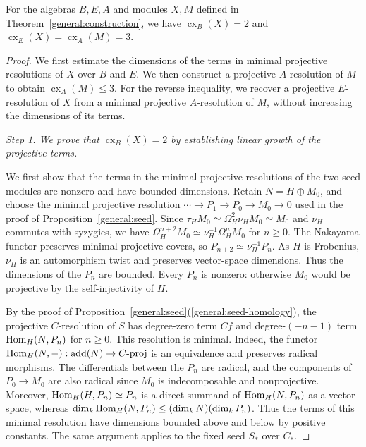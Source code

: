 \documentclass[11pt]{article}
\begin{document}
\begin{Prop}\label{general:complexity}
For the algebras $B,E,A$ and modules $X,M$ defined in
Theorem~\ref{general:construction}, we have
$\operatorname{cx}_B(X)=2$ and
\mbox{$\operatorname{cx}_E(X)=\operatorname{cx}_A(M)=3$}.
\end{Prop}
\begin{proof}
We first estimate the dimensions of the terms in minimal projective
resolutions of $X$ over $B$ and $E$. We then construct a projective
$A$-resolution of $M$ to obtain $\operatorname{cx}_A(M)\le3$.
For the reverse inequality, we recover a projective $E$-resolution
of $X$ from a minimal projective $A$-resolution of $M$, without
increasing the dimensions of its terms.

\smallskip\noindent
\emph{Step 1. We prove that $\operatorname{cx}_B(X)=2$ by establishing linear growth of the projective terms.}
\par\nobreak\smallskip\nobreak
\noindent
We first show that the terms in the minimal projective resolutions
of the two seed modules are nonzero and have bounded dimensions.
Retain $N=H\oplus M_0$, and choose the minimal projective resolution
$\cdots\to P_1\to P_0\to M_0\to0$ used in the proof of
Proposition~\ref{general:seed}. Since
$\tau_HM_0\simeq\Omega_H^2\nu_HM_0\simeq M_0$ and $\nu_H$
commutes with syzygies, we have
$\Omega_H^{n+2}M_0\simeq\nu_H^{-1}\Omega_H^nM_0$ for $n\ge0$.
The Nakayama functor preserves minimal projective covers, so
$P_{n+2}\simeq\nu_H^{-1}P_n$. As $H$ is Frobenius, $\nu_H$ is
an automorphism twist and preserves vector-space dimensions.
Thus the dimensions of the $P_n$ are bounded. Every $P_n$ is nonzero:
otherwise $M_0$ would be projective by the self-injectivity of $H$.

By the proof of Proposition~\ref{general:seed}\textup{(\ref{general:seed-homology})},
the projective $C$-resolution of $S$ has degree-zero term $Cf$ and degree-$(-n-1)$ term
${\rm Hom}_H(N,P_n)$ for $n\ge0$. This resolution is minimal. Indeed, the functor ${\rm Hom}_H(N,-):{\rm add}(N)\to C\text{-}\mathrm{proj}$ is an equivalence and preserves radical morphisms. The differentials
between the $P_n$ are radical, and the components of $P_0\to M_0$
are also radical since $M_0$ is indecomposable and nonprojective.
Moreover, ${\rm Hom}_H(H,P_n)\simeq P_n$ is a direct summand of
${\rm Hom}_H(N,P_n)$ as a vector space, whereas
$\dim_k{\rm Hom}_H(N,P_n)\le(\dim_kN)(\dim_kP_n)$.
Thus the terms of this minimal resolution have dimensions bounded
above and below by positive constants. The same argument applies
to the fixed seed $S_*$ over $C_*$.


\end{proof}
\end{document}

